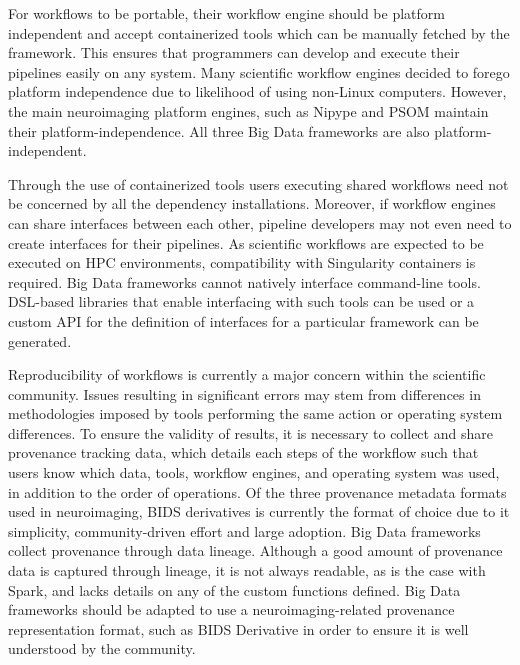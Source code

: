         For workflows to be portable, their workflow engine should be platform
        independent and accept containerized tools which can be manually fetched
        by the framework. This ensures that programmers can develop and execute
        their pipelines easily on any system. Many scientific workflow engines
        decided to forego platform independence due to likelihood of using
        non-Linux computers. However, the main neuroimaging platform engines,
        such as Nipype and PSOM maintain their platform-independence. All three
        Big Data frameworks are also platform-independent.


        Through the use of containerized tools users executing shared workflows
        need not be concerned by all the dependency installations. Moreover, if
        workflow engines can share interfaces between each other, pipeline
        developers may not even need to create interfaces for their pipelines.
        As scientific workflows are expected to be executed on HPC environments,
        compatibility with Singularity containers is required. Big Data
        frameworks cannot natively interface command-line tools. DSL-based
        libraries that enable interfacing with such tools can be used or a
        custom API for the definition of interfaces for a particular framework
        can be generated.


        Reproducibility of workflows is currently a major concern within the
        scientific community. Issues resulting in significant errors may stem
        from differences in methodologies imposed by tools performing the same
        action or operating system differences. To ensure the validity of
        results, it is necessary to collect and share provenance tracking data,
        which details each steps of the workflow such that users know which
        data, tools, workflow engines, and operating system was used, in
        addition to the order of operations. Of the three provenance metadata
        formats used in neuroimaging, BIDS derivatives is currently the format
        of choice due to it simplicity, community-driven effort and large
        adoption. Big Data frameworks collect provenance through data lineage.
        Although a good amount of provenance data is captured through lineage,
        it is not always readable, as is the case with Spark, and lacks details
        on any of the custom functions defined. Big Data frameworks should be
        adapted to use a neuroimaging-related provenance representation format,
        such as BIDS Derivative in order to ensure it is well understood by the
        community.


